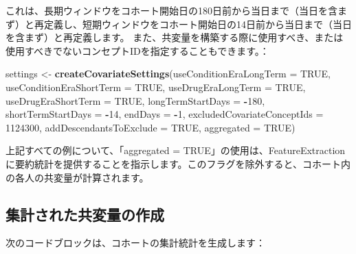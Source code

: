 \documentclass[
  11pt]{book}
\makeatletter
\newenvironment{Shaded}{\begin{snugshade}}{\end{snugshade}}
\newcommand{\AttributeTok}[1]{\textcolor[rgb]{0.13,0.29,0.53}{#1}}
\newcommand{\ConstantTok}[1]{\textcolor[rgb]{0.56,0.35,0.01}{#1}}
\newcommand{\DecValTok}[1]{\textcolor[rgb]{0.00,0.00,0.81}{#1}}
\newcommand{\FunctionTok}[1]{\textcolor[rgb]{0.13,0.29,0.53}{\textbf{#1}}}
\newcommand{\NormalTok}[1]{#1}
\newcommand{\OtherTok}[1]{\textcolor[rgb]{0.56,0.35,0.01}{#1}}
\newcommand{\SpecialCharTok}[1]{\textcolor[rgb]{0.81,0.36,0.00}{\textbf{#1}}}
\newenvironment{kframe}{%
\medskip{}
\setlength{\fboxsep}{.8em}
 \def\at@end@of@kframe{}%
 \ifinner\ifhmode%
  \def\at@end@of@kframe{\end{minipage}}%
  \begin{minipage}{\columnwidth}%
 \fi\fi%
 \def\FrameCommand##1{\hskip\@totalleftmargin \hskip-\fboxsep
 \colorbox{myShadeColor}{##1}\hskip-\fboxsep
     \hskip-\linewidth \hskip-\@totalleftmargin \hskip\columnwidth}%
 \MakeFramed {\advance\hsize-\width
   \@totalleftmargin\z@ \linewidth\hsize
   \@setminipage}}%
 {\par\unskip\endMakeFramed%
 \at@end@of@kframe}
\newenvironment{rmdblock}[1]
  {
  \begin{itemize}
  \renewcommand{\labelitemi}{
    \raisebox{-.7\height}[0pt][0pt]{
      {\setkeys{Gin}{width=3em,keepaspectratio}\texttt{[image: images/\#1]}}
    }
  }
  \setlength{\fboxsep}{1em}
  \begin{kframe}
  \item
  }
  {
  \end{kframe}
  \end{itemize}
  }
\newenvironment{rmdimportant}
  {\begin{rmdblock}{important}}
  {\end{rmdblock}}
\theoremstyle{definition}
\theoremstyle{definition}
\theoremstyle{definition}
\theoremstyle{definition}
\theoremstyle{remark}
\makeatother
\begin{document}
これは、長期ウィンドウをコホート開始日の180日前から当日まで（当日を含まず）と再定義し、短期ウィンドウをコホート開始日の14日前から当日まで（当日を含まず）と再定義します。 また、共変量を構築する際に使用すべき、または使用すべきでないコンセプトIDを指定することもできます。：

\begin{Shaded}
\begin{Highlighting}[]
\NormalTok{settings }\OtherTok{\textless{}{-}} \FunctionTok{createCovariateSettings}\NormalTok{(}\AttributeTok{useConditionEraLongTerm =} \ConstantTok{TRUE}\NormalTok{,}
                                    \AttributeTok{useConditionEraShortTerm =} \ConstantTok{TRUE}\NormalTok{,}
                                    \AttributeTok{useDrugEraLongTerm =} \ConstantTok{TRUE}\NormalTok{,}
                                    \AttributeTok{useDrugEraShortTerm =} \ConstantTok{TRUE}\NormalTok{,}
                                    \AttributeTok{longTermStartDays =} \SpecialCharTok{{-}}\DecValTok{180}\NormalTok{,}
                                    \AttributeTok{shortTermStartDays =} \SpecialCharTok{{-}}\DecValTok{14}\NormalTok{,}
                                    \AttributeTok{endDays =} \SpecialCharTok{{-}}\DecValTok{1}\NormalTok{,}
                                    \AttributeTok{excludedCovariateConceptIds =} \DecValTok{1124300}\NormalTok{,}
                                    \AttributeTok{addDescendantsToExclude =} \ConstantTok{TRUE}\NormalTok{,}
                                    \AttributeTok{aggregated =} \ConstantTok{TRUE}\NormalTok{)}
\end{Highlighting}
\end{Shaded}

\begin{rmdimportant}
上記すべての例について、「aggregated = TRUE」の使用は、FeatureExtractionに要約統計を提供することを指示します。このフラグを除外すると、コホート内の各人の共変量が計算されます。
\end{rmdimportant}

\subsection{集計された共変量の作成}\label{ux96c6ux8a08ux3055ux308cux305fux5171ux5909ux91cfux306eux4f5cux6210}

次のコードブロックは、コホートの集計統計を生成します：
\end{document}
